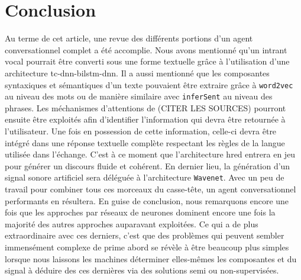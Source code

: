 \section*{Conclusion}
Au terme de cet article, une revue des différents portions d'un agent conversationnel complet a été accomplie. Nous avons mentionné qu'un intrant vocal pourrait être converti sous une forme textuelle grâce à l'utilisation d'une architecture \gls{tc}-\gls{dnn}-\gls{bilstm}-\gls{dnn}. Il a aussi mentionné que les composantes syntaxiques et sémantiques d'un texte pouvaient être extraire grâce à \texttt{word2vec} au niveau des mots ou de manière similaire avec \texttt{inferSent} au niveau des phrases. Les méchanismes d'attentions de (CITER LES SOURCES) pourront ensuite être exploités afin d’identifier l'information qui devra être retournée à l'utilisateur. Une fois en possession de cette information, celle-ci devra être intégré dans une réponse textuelle complète respectant les règles de la langue utilisée dans l'échange. C'est à ce moment que l'architecture \gls{hred} entrera en jeu pour générer un discours fluide et cohérent. En dernier lieu, la génération d'un signal sonore artificiel sera déléguée à l'architecture \texttt{Wavenet}. Avec un peu de travail pour combiner tous ces morceaux du casse-tête, un agent conversationnel performants en résultera. En guise de conclusion, nous remarquons encore une fois que les approches par réseaux de neurones dominent encore une fois la majorité des autres approches auparavant exploitées. Ce qui a de plus extraordinaire avec ces derniers, c'est que des problèmes qui peuvent sembler immensément complexe de prime abord se révèle à être beaucoup plus simples lorsque nous laissons les machines déterminer elles-mêmes les composantes et du signal à déduire des ces dernières via des solutions semi ou non-supervisées. 
